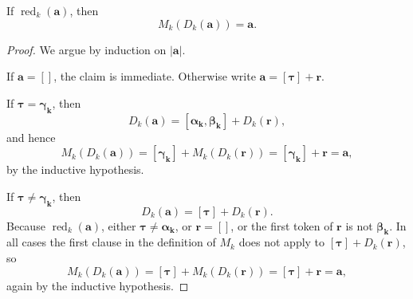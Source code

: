 \begin{lemma}
    \label{lemma:bpe-reduced-reconstruction}
    If $\operatorname{red}_k(\mathbf{a})$, then
    \[
    M_k(D_k(\mathbf{a})) = \mathbf{a}.
    \]
\end{lemma}
\begin{proof}
    We argue by induction on $|\mathbf{a}|$.

    If $\mathbf{a} = []$, the claim is immediate.
    Otherwise write $\mathbf{a} = [\boldsymbol{\tau}] + \mathbf{r}$.

    If $\boldsymbol{\tau} = \boldsymbol{\gamma_k}$, then
    \[
    D_k(\mathbf{a}) = [\boldsymbol{\alpha_k}, \boldsymbol{\beta_k}] + D_k(\mathbf{r}),
    \]
    and hence
    \[
    M_k(D_k(\mathbf{a}))
    =
    [\boldsymbol{\gamma_k}] + M_k(D_k(\mathbf{r}))
    =
    [\boldsymbol{\gamma_k}] + \mathbf{r}
    =
    \mathbf{a},
    \]
    by the inductive hypothesis.

    If $\boldsymbol{\tau} \neq \boldsymbol{\gamma_k}$, then
    \[
    D_k(\mathbf{a}) = [\boldsymbol{\tau}] + D_k(\mathbf{r}).
    \]
    Because $\operatorname{red}_k(\mathbf{a})$, either $\boldsymbol{\tau} \neq \boldsymbol{\alpha_k}$,
    or $\mathbf{r} = []$, or the first token of $\mathbf{r}$ is not $\boldsymbol{\beta_k}$.
    In all cases the first clause in the definition of $M_k$ does not apply to
    $[\boldsymbol{\tau}] + D_k(\mathbf{r})$, so
    \[
    M_k(D_k(\mathbf{a}))
    =
    [\boldsymbol{\tau}] + M_k(D_k(\mathbf{r}))
    =
    [\boldsymbol{\tau}] + \mathbf{r}
    =
    \mathbf{a},
    \]
    again by the inductive hypothesis.
\end{proof}

